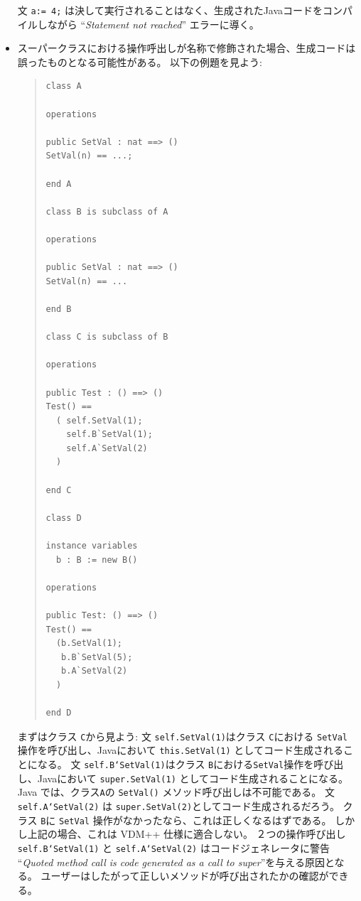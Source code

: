 \documentclass[\pformat,11pt]{jarticle}
\begin{document}
\begin{itemize}
文 {\tt a:= 4;} は決して実行されることはなく、生成されたJavaコードをコンパイルしながら ``{\em Statement not reached}'' エラーに導く。
\item スーパークラスにおける操作呼出しが名称で修飾された場合、生成コードは誤ったものとなる可能性がある。
以下の例題を見よう:

\begin{quote}
\begin{small}
\begin{verbatim}
class A

operations

public SetVal : nat ==> ()
SetVal(n) == ...;

end A

class B is subclass of A

operations

public SetVal : nat ==> ()
SetVal(n) == ...

end B

class C is subclass of B

operations

public Test : () ==> ()
Test() ==
  ( self.SetVal(1);
    self.B`SetVal(1);
    self.A`SetVal(2)
  )

end C

class D

instance variables
  b : B := new B()

operations

public Test: () ==> ()
Test() ==
  (b.SetVal(1);
   b.B`SetVal(5);
   b.A`SetVal(2)
  )

end D
\end{verbatim}
\end{small}
\end{quote}

まずはクラス {\tt C}から見よう:
文 {\tt self.SetVal(1)}はクラス {\tt C}における {\tt SetVal} 操作を呼び出し、Javaにおいて {\tt this.SetVal(1)} としてコード生成されることになる。
文 {\tt self.B`SetVal(1)}はクラス {\tt B}における{\tt SetVal}操作を呼び出し、Javaにおいて {\tt super.SetVal(1)} としてコード生成されることになる。
 Java では、クラス{\tt A}の {\tt SetVal()} メソッド呼び出しは不可能である。
文 {\tt self.A`SetVal(2)} は {\tt super.SetVal(2)}としてコード生成されるだろう。
クラス {\tt B}に {\tt SetVal} 操作がなかったなら、これは正しくなるはずである。
しかし上記の場合、これは VDM++ 仕様に適合しない。
 ２つの操作呼び出し {\tt self.B`SetVal(1)} と {\tt self.A`SetVal(2)} はコードジェネレータに警告 ``{\em Quoted method call is code generated as a call to super}''を与える原因となる。
ユーザーはしたがって正しいメソッドが呼び出されたかの確認ができる。


\end{itemize}
\end{document}
